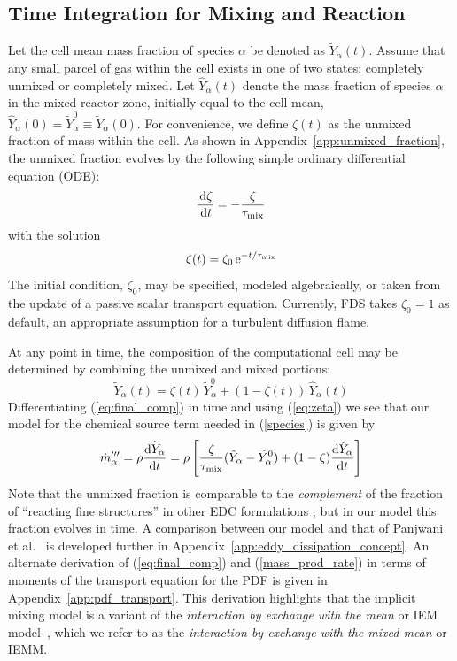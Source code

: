 \subsection{Time Integration for Mixing and Reaction}
\label{sec:subgrid_evironment}

Let the cell mean mass fraction of species $\alpha$ be denoted as $\widetilde{Y}_\alpha(t)$. Assume that any small parcel of gas within the cell exists in one of two states: completely unmixed or completely mixed.  Let $\hat{Y}_\alpha(t)$ denote the mass fraction of species $\alpha$ in the mixed reactor zone, initially equal to the cell mean, $\hat{Y}_\alpha(0) = \widetilde{Y}_{\alpha}^0 \equiv \widetilde{Y}_{\alpha}(0)$. For convenience, we define $\zeta(t)$ as the unmixed fraction of mass within the cell. As shown in Appendix~\ref{app:unmixed_fraction}, the unmixed fraction evolves by the following simple ordinary differential equation (ODE):
\begin{equation}
\label{eq:zeta}
\frac{\,\mathrm{d} \zeta}{\,\mathrm{d} t}=-\frac{\zeta}{\tau_{\rm mix}}
\end{equation}
with the solution
\begin{equation}
\label{eq:zeta_soln}
\zeta(t) = \zeta_0 \,{\rm e}^{-t/\tau_{\rm mix}}
\end{equation}
The initial condition, $\zeta_0$, may be specified, modeled algebraically, or taken from the update of a passive scalar transport equation.  Currently, FDS takes $\zeta_0=1$ as default, an appropriate assumption for a turbulent diffusion flame.

At any point in time, the composition of the computational cell may be determined by combining the unmixed and mixed portions:
\begin{equation}
\label{eq:final_comp}
\widetilde{Y}_{\alpha}(t)= \zeta(t) \, \widetilde{Y}_{\alpha}^0 + (1-\zeta(t)) \, \hat{Y}_{\alpha}(t)
\end{equation}
Differentiating (\ref{eq:final_comp}) in time and using (\ref{eq:zeta}) we see that our model for the chemical source term needed in (\ref{species}) is given by
\begin{equation}
\label{mass_prod_rate}
\dot{m}^{\prime\prime\prime}_{\alpha} = \rho \frac{\mbox{d}\widetilde{Y}_{\alpha}}{\mbox{d}t}
= \rho \left[ \frac{\zeta}{\tau_{\rm{mix}}} (\hat{Y}_\alpha - \widetilde{Y}_{\alpha}^0)  + (1-\zeta) \frac{\mbox{d}\hat{Y}_\alpha}{\mbox{d}t} \right]
\end{equation}
Note that the unmixed fraction is comparable to the \emph{complement} of the fraction of ``reacting fine structures'' in other EDC formulations \cite{Chen:1,Panjwani:2010}, but in our model this fraction evolves in time.  A comparison between our model and that of Panjwani et al.~\cite{Panjwani:2010} is developed further in Appendix~\ref{app:eddy_dissipation_concept}. An alternate derivation of (\ref{eq:final_comp}) and (\ref{mass_prod_rate}) in terms of moments of the transport equation for the PDF is given in Appendix~\ref{app:pdf_transport}.  This derivation highlights that the implicit mixing model is a variant of the {\em interaction by exchange with the mean} or IEM model~\cite{Dopazo:1974}, which we refer to as the {\em interaction by exchange with the mixed mean} or IEMM.

